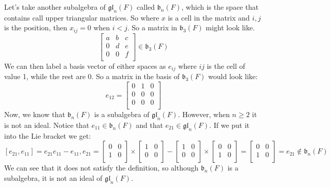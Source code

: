 \documentclass[12pt, letterpaper]{article}
\begin{document}
Let's take another subalgebra of $\mathfrak{gl}_n(F)$ called $\mathfrak{b}_n(F)$, which is the space that contains call upper triangular matrices. So where $x$ is a cell in the matrix and $i,j$ is the position, then $x_{ij} = 0$ when $i < j$. So a matrix in $\mathfrak{b}_3(F)$ might look like.
\[ 
\begin{bmatrix}
a & b & c \\
0 & d & e \\
0 & 0 & f \\
\end{bmatrix} \in \mathfrak{b}_3(F)
\]
We can then label a basis vector of either spaces as $e_{ij}$ where $ij$ is the cell of value 1, while the rest are 0. So a matrix in the basis of $\mathfrak{b}_3(F)$ would look like:
\[
e_{12} = \begin{bmatrix}
0 & 1 & 0 \\
0 & 0 & 0 \\
0 & 0 & 0 \\
\end{bmatrix}
\]
 Now, we know that $\mathfrak{b}_n(F)$ is a subalgebra of $\mathfrak{gl}_n(F)$. However, when $n \geq 2$ it is not an ideal. Notice that $e_{11} \in \mathfrak{b}_n(F)$ and that $e_{21} \in \mathfrak{gl}_n(F)$. If we put it into the Lie bracket we get:
\[
	[e_{21},e_{11}] = e_{21}e_{11} - e_{11},e_{21} = 
\begin{bmatrix}
0 & 0\\
1 & 0\\
\end{bmatrix} \times
\begin{bmatrix}
1 & 0\\
0 & 0\\
\end{bmatrix} -
\begin{bmatrix}
1 & 0\\
0 & 0\\
\end{bmatrix} \times
\begin{bmatrix}
0 & 0\\
1 & 0\\
\end{bmatrix} = 
\begin{bmatrix}
0 & 0\\
1 & 0\\
\end{bmatrix} = e_{21} \not\in \mathfrak{b}_n(F)
\]
We can see that it does not satisfy the definition, so although $\mathfrak{b}_n(F)$ is a subalgebra, it is not an ideal of $\mathfrak{gl}_n(F)$.
\end{document}
